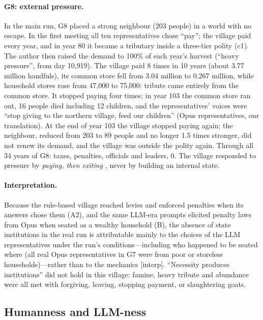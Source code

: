 \documentclass[11pt]{article}
\newcommand{\lbl}[1]{\textsf{[#1]}}
\begin{document}
\paragraph{G8: external pressure.} In the main run, G8 placed a strong neighbour (203 people) in a world with no escape. In the first meeting all ten representatives chose ``pay''; the village paid every year, and in year 80 it became a tributary inside a three-tier polity (c1). The author then raised the demand to 100\% of each year's harvest (``heavy pressure'', from day 10{,}919). The village paid 8 times in 10 years (about 3.77 million handfuls), its common store fell from 3.04 million to 0.267 million, while household stores rose from 47{,}000 to 75{,}000: tribute came entirely from the common store. It stopped paying four times; in year 103 the common store ran out, 16 people died including 12 children, and the representatives' voices were ``stop giving to the northern village, feed our children'' (Opus representatives, our translation). At the end of year 103 the village stopped paying again; the neighbour, reduced from 203 to 89 people and no longer 1.5 times stronger, did not renew its demand, and the village was outside the polity again. Through all 34 years of G8: taxes, penalties, officials and leaders, 0. The village responded to pressure by \emph{paying, then exiting} \citep{hirschman1970exit,scott2017against}, never by building an internal state.

\paragraph{Interpretation.} Because the rule-based village reached levies and enforced penalties when its answers chose them (A2), and the same LLM-era prompts elicited penalty laws from Opus when seated as a wealthy household (B), the absence of state institutions in the real run is attributable mainly to the choices of the LLM representatives under the run's conditions---including who happened to be seated where (all real Opus representatives in G7 were from poor or storeless households)---rather than to the mechanics \lbl{interp}. ``Necessity produces institutions'' did not hold in this village: famine, heavy tribute and abundance were all met with forgiving, leaving, stopping payment, or slaughtering goats.

\subsection{Humanness and LLM-ness}
\end{document}
